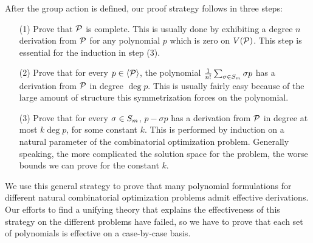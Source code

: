 After the group action is defined, our proof strategy follows in three steps:
\begin{enumerate}
\item[(1)] Prove that $\mathcal P$ is complete. This is usually done by exhibiting a degree $n$ derivation from $\mathcal P$ for any polynomial $p$ which is zero on $V(\mathcal P)$. This step is essential for the induction in step (3). 
\item[(2)] Prove that for every $p \in \langle \mathcal P \rangle$, the polynomial $\frac{1}{n!} \sum_{\sigma \in S_{m}} \sigma p$ has a derivation from $\mathcal P$ in degree $\deg p$. This is usually fairly easy because of the large amount of structure this symmetrization forces on the polynomial. 
\item[(3)] Prove that for every $\sigma \in S_{m}$, $p - \sigma p$ has a derivation from $\mathcal P$ in degree at most $k \deg p$, for some constant $k$. This is performed by induction on a natural parameter of the combinatorial optimization problem. Generally speaking, the more complicated the solution space for the problem, the worse bounds we can prove for the constant $k$. 
\end{enumerate}
We use this general strategy to prove that many polynomial formulations for different natural combinatorial optimization problems admit effective derivations. 
Our efforts to find a unifying theory that explains the effectiveness of this strategy on the different problems have failed, so we have to prove that each set of polynomials is effective on a case-by-case basis.  

